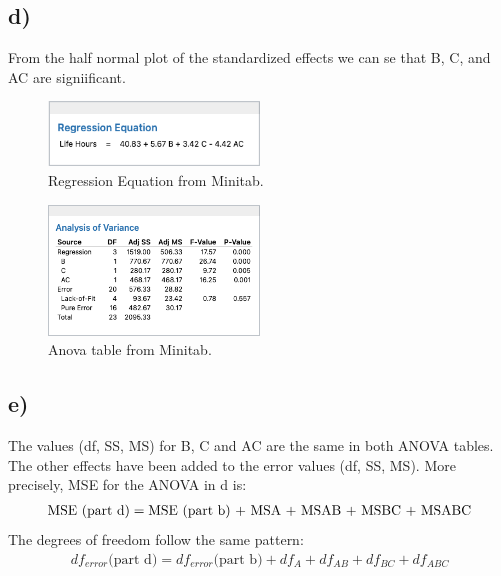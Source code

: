 \documentclass{article}
\begin{document}
\subsection*{d)}
From the half normal plot of the standardized effects we can se that B, C, and AC are signiificant.
\begin{figure}[h]
    \centering
    \includegraphics[width=0.5\textwidth]{./images/1_d_2.png}
    \caption{Regression Equation from Minitab.}
    \label{fig:3_b_2}
\end{figure}
\begin{figure}[h]
    \centering
    \includegraphics[width=0.5\textwidth]{./images/1_d_1.png}
    \caption{Anova table from Minitab.}
    \label{fig:3_b_2}
\end{figure}
\subsection*{e)}
The values (df, SS, MS) for B, C and AC are the same in both ANOVA tables. The other effects have been added to the error values (df, SS, MS).
More precisely, MSE for the ANOVA in d is:
\begin{align*}
    \text{MSE (part d)} = \text{MSE (part b) + \text{MSA} + \text{MSAB} + \text{MSBC} + \text{MSABC}}
\end{align*}
The degrees of freedom follow the same pattern:
\begin{align*}
    df_{error}\text{(part d)} = df_{error}\text{(part b)} + df_{A} + df_{AB} + df_{BC} + df_{ABC}
\end{align*}
\clearpage
\end{document}
